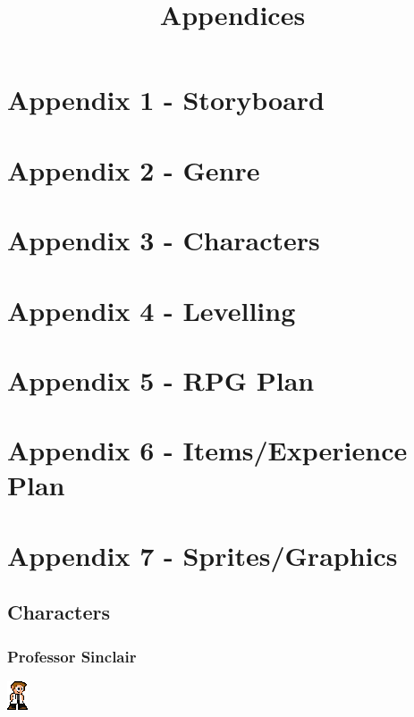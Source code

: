 \documentclass{article}
\title{Appendices}
\date{}
\begin{document}
\begin{titlepage}
\maketitle
\end{titlepage}

\tableofcontents

\pagebreak

\section{Appendix 1 - Storyboard}


\section{Appendix 2 - Genre}


\section{Appendix 3 - Characters}


\section{Appendix 4 - Levelling}


\section{Appendix 5 - RPG Plan}


\section{Appendix 6 - Items/Experience Plan}


\section{Appendix 7 - Sprites/Graphics}
\subsection{Characters}
\subsubsection{Professor Sinclair}
\includegraphics{./references/sprites/Sinclair.png}
\end{document}
